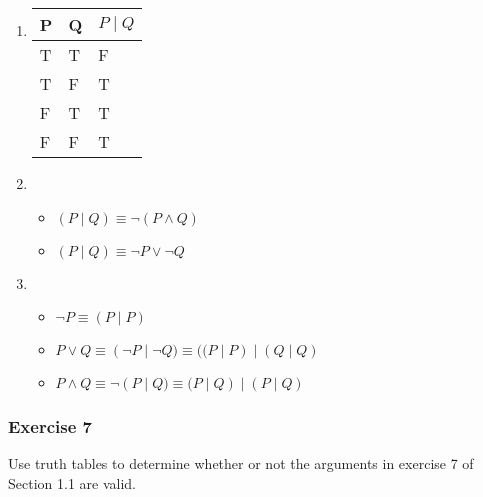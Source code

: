     \begin{solution}
        \begin{enumerate}[label=(\alph*)]
            \item {
                \begin{tabular}[c]{l l | l}
                    P & Q & $P\; |\; Q$ \\ \hline
                    T & T & F \\
                    T & F & T \\
                    F & T & T \\
                    F & F & T \\
                \end{tabular}
            }
            
            \item {
                \begin{itemize}
                    \item $(P\; |\; Q) \equiv \neg (P \wedge Q)$
                    \item $(P\; |\; Q) \equiv \neg P \vee \neg Q$
                \end{itemize}
            }
            
            \item {
                \begin{itemize}
                    \item $\neg P \equiv (P\; |\; P)$ 
                    \item $P \vee Q \equiv (\neg P\; |\; \neg Q) \equiv ((P\; |\; P)\; |\; (Q\; |\; Q)$
                    \item $P \wedge Q \equiv \neg(P\; |\; Q) \equiv (P\; |\; Q)\; |\; (P\; |\; Q)$
                \end{itemize}
            }
        \end{enumerate}
    \end{solution}
\subsubsection{Exercise 7}

\question Use truth tables to determine whether or not the arguments in exercise 7 of Section 1.1 are valid.

